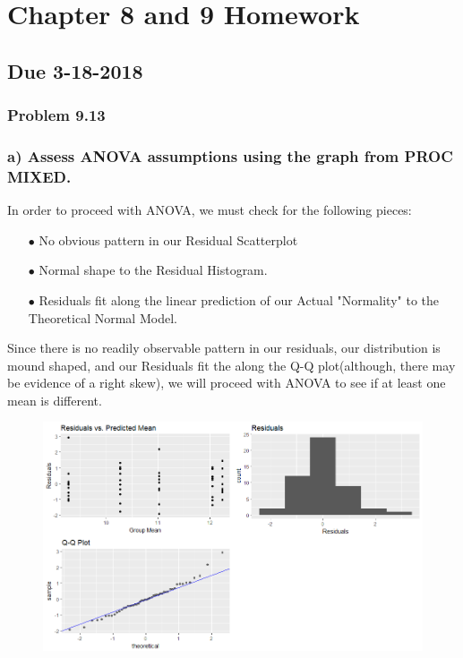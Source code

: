 \documentclass{article}
\begin{document}
\section*{Chapter 8 and 9 Homework}
\subsection*{Due 3-18-2018}
\subsubsection*{Problem 9.13}
\subsubsection*{ a) Assess ANOVA assumptions using the graph from PROC MIXED.}

In order to proceed with ANOVA, we must check for the following pieces:
\begin{itemize}[leftmargin=+.5in]
 	\item[$\bullet$] No obvious pattern in our Residual Scatterplot
	\item[$\bullet$] Normal shape to the Residual Histogram.
 	\item[$\bullet$] Residuals fit along the linear prediction of our Actual "Normality" to the Theoretical Normal Model.  
\end{itemize}

Since there is no readily observable pattern in our residuals, our distribution is mound shaped, and our Residuals fit the along the Q-Q plot(although, there may be evidence of a right skew), we will proceed with ANOVA to see if at least one mean is different.  

\begin{figure}[h]
\centering
\includegraphics[width = 1.0\textwidth]{AnovaCheck.png}
\end{figure}
\end{document}
